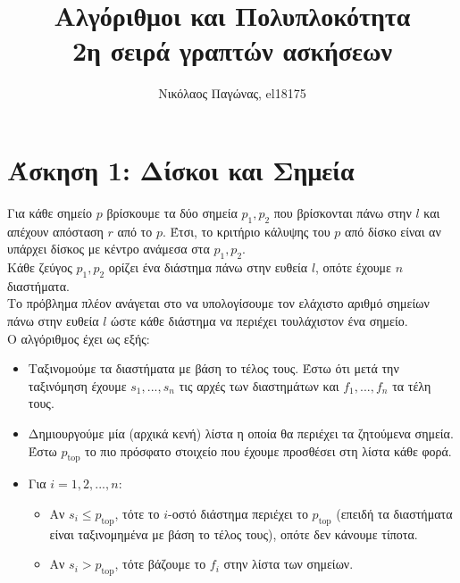 

\newcommand{\imagesPath}{.}

\title{
	Αλγόριθμοι και Πολυπλοκότητα \\
	2η σειρά γραπτών ασκήσεων
}
\author{Νικόλαος Παγώνας, el18175}
\date{}


	\renewcommand{\setminus}{\mathbin{\backslash}}
	\maketitle
	
	\section*{Άσκηση 1: Δίσκοι και Σημεία}
	
		Για κάθε σημείο $p$ βρίσκουμε τα δύο σημεία $p_1, p_2$ που βρίσκονται πάνω στην $l$ και απέχουν απόσταση $r$ από το $p$. Έτσι, το κριτήριο κάλυψης του $p$ από δίσκο είναι αν υπάρχει δίσκος με κέντρο ανάμεσα στα $p_1, p_2$. \\
		
		Κάθε ζεύγος $p_1, p_2$ ορίζει ένα διάστημα πάνω στην ευθεία $l$, οπότε έχουμε $n$ διαστήματα. \\ 
		
		Το πρόβλημα πλέον ανάγεται στο να υπολογίσουμε τον ελάχιστο αριθμό σημείων πάνω στην ευθεία $l$ ώστε κάθε διάστημα να περιέχει τουλάχιστον ένα σημείο. \\
		
		Ο αλγόριθμος έχει ως εξής: 
		
		\begin{itemize}
			\item Ταξινομούμε τα διαστήματα με βάση το τέλος τους. Έστω ότι μετά την ταξινόμηση έχουμε $s_1, ..., s_n$ τις αρχές των διαστημάτων και $f_1, ..., f_n$ τα τέλη τους. 
			\item Δημιουργούμε μία (αρχικά κενή) λίστα η οποία θα περιέχει τα ζητούμενα σημεία. Έστω $p_\text{top}$ το πιο πρόσφατο στοιχείο που έχουμε προσθέσει στη λίστα κάθε φορά.
			\item Για $i = 1, 2,...,n$:
				\begin{itemize}
					\item Αν $s_i \leq p_\text{top}$, τότε το $i$-οστό διάστημα περιέχει το $p_\text{top}$ (επειδή τα διαστήματα είναι ταξινομημένα με βάση το τέλος τους), οπότε δεν κάνουμε τίποτα. 
					\item Αν $s_i > p_\text{top}$, τότε βάζουμε το $f_i$ στην λίστα των σημείων. 
				\end{itemize}
		\end{itemize}  
	
